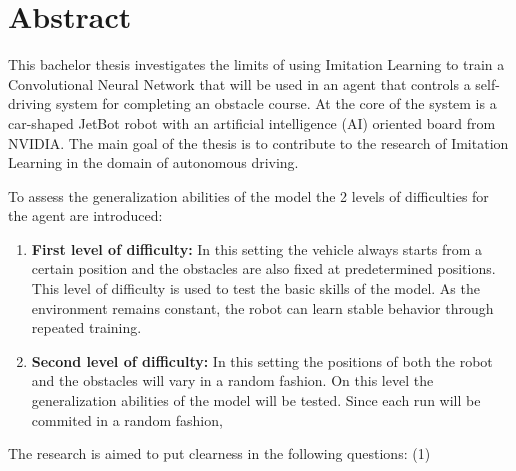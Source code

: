 \section*{Abstract}
\label{sec:Abstract}

This bachelor thesis investigates the limits of using Imitation Learning to train a Convolutional Neural Network that will be used in an agent that controls a self-driving system for completing an obstacle course. At the core of the system is a car-shaped JetBot robot with an artificial intelligence (AI) oriented board from NVIDIA. The main goal of the thesis is to contribute to the research of Imitation Learning in the domain of autonomous driving.

To assess the generalization abilities of the model the 2 levels of difficulties for the agent are introduced:
\begin{enumerate}
  \item \textbf{First level of difficulty:} In this setting the vehicle always starts from a certain position and the obstacles are also fixed at predetermined positions. This level of difficulty is used to test the basic skills of the model. As the environment remains constant, the robot can learn stable behavior through repeated training.
  \item \textbf{Second level of difficulty:} In this setting the positions of both the robot and the obstacles will vary in a random fashion. On this level the generalization abilities of the model will be tested. Since each run will be commited in a random fashion, %
\end{enumerate}

The research is aimed to put clearness in the following questions: (1) %